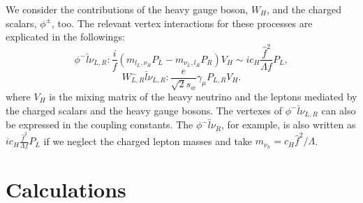 \documentclass[preprint,aps,12pt,showpacs,nofootinbib,tightenlines]{revtex4}
\begin{document}
We consider the contributions of the heavy gauge boson, $W_{H}$,
and the charged scalars, $\phi^\pm$, too.
The relevant vertex interactions for these processes are explicated in the followings:
\begin{equation}
\phi^-\bar l \nu_{L,R}:\frac{i}{f}(m_{l_L,\nu_R} P_L-m_{\nu_{L},l_R}P_R) V_H\sim ic_H\frac{{\hat f}^2}{\Lambda f} P_L,\label{hlv}
\end{equation}
\begin{equation}
W^-_{L,R}\bar l \nu_{L,R}:\frac{e}{\sqrt{2} s_w}\gamma_{\mu}   P_{L,R} V_H.
\label{wlv}
\end{equation}
where $V_H$ is the mixing matrix of the heavy neutrino and the leptons mediated by the charged scalars and
the heavy gauge bosons. The vertexes of $\phi^-\bar l \nu_{L,R}$ can also be expressed in the coupling constants. The
$\phi^-\bar l \nu_{R}$, for example, is also written as  $ic_H\frac{\hat f^2}{\Lambda f}P_L$
if we neglect the charged lepton masses and take $m_{\nu_h}=c_H\hat f^2/ \Lambda$.



\section{Calculations}
\end{document}
